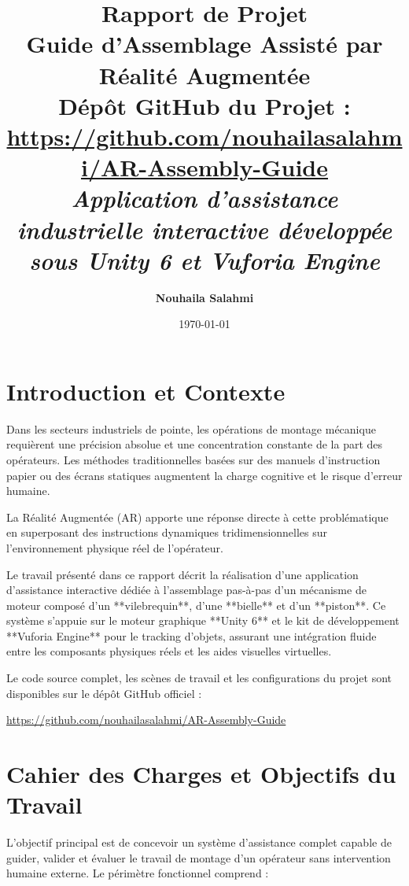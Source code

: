 \documentclass[12pt,a4paper]{article}
\title{
    \vspace{1.5cm}
    \Huge \textbf{Rapport de Projet} \\
    \vspace{0.5cm}
    \LARGE \textbf{Guide d'Assemblage Assisté par Réalité Augmentée} \\
    \vspace{1.5cm}
    \large \textbf{Dépôt GitHub du Projet :} \\
    \url{https://github.com/nouhailasalahmi/AR-Assembly-Guide} \\
    \vspace{1.5cm}
    \large \textit{Application d'assistance industrielle interactive développée sous Unity 6 et Vuforia Engine}
    \vspace{2.5cm}
}
\author{\textbf{Nouhaila Salahmi}}
\date{\today}
\begin{document}
\maketitle
\thispagestyle{empty}
\newpage

\tableofcontents
\newpage

\section{Introduction et Contexte}
Dans les secteurs industriels de pointe, les opérations de montage mécanique requièrent une précision absolue et une concentration constante de la part des opérateurs. Les méthodes traditionnelles basées sur des manuels d'instruction papier ou des écrans statiques augmentent la charge cognitive et le risque d'erreur humaine.

La Réalité Augmentée (AR) apporte une réponse directe à cette problématique en superposant des instructions dynamiques tridimensionnelles sur l'environnement physique réel de l'opérateur. 

Le travail présenté dans ce rapport décrit la réalisation d'une application d'assistance interactive dédiée à l'assemblage pas-à-pas d'un mécanisme de moteur composé d'un **vilebrequin**, d'une **bielle** et d'un **piston**. Ce système s'appuie sur le moteur graphique **Unity 6** et le kit de développement **Vuforia Engine** pour le tracking d'objets, assurant une intégration fluide entre les composants physiques réels et les aides visuelles virtuelles.

Le code source complet, les scènes de travail et les configurations du projet sont disponibles sur le dépôt GitHub officiel : 
\begin{center}
    \url{https://github.com/nouhailasalahmi/AR-Assembly-Guide}
\end{center}

\section{Cahier des Charges et Objectifs du Travail}
L'objectif principal est de concevoir un système d'assistance complet capable de guider, valider et évaluer le travail de montage d'un opérateur sans intervention humaine externe. Le périmètre fonctionnel comprend :
\end{document}
